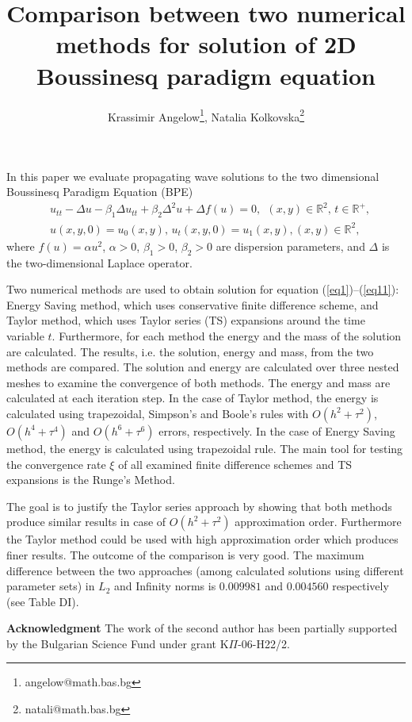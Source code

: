 \documentclass{article}
\newcommand{\RR}{\mathbb{R}}
\newcommand{\rf}[1]{(\ref{#1})}
\begin{document}
\title{Comparison between two numerical methods for solution of 2D Boussinesq paradigm equation}

\author{Krassimir Angelow\thanks{angelow@math.bas.bg}, Natalia Kolkovska\thanks{natali@math.bas.bg}}

\maketitle





In this paper we evaluate propagating wave solutions to the two dimensional Boussinesq Paradigm Equation (BPE)
\begin{align} 
&u_{tt} - \Delta u -\beta_1  \Delta u_{tt} +\beta_2 \Delta ^2 u + \Delta f(u)=0,~~     (x,y) \in \RR^2, \, t\in\RR^+, \label{eq1}
\\ &u(x,y,0)=u_0(x,y), \, u_t(x,y,0)=u_1(x,y),   (x,y) \in \RR^2,~~\label{eq11}
\end{align}
where $f(u)=\alpha u^2$,  $\alpha>0$, $\beta_1>0$, $\beta_2>0$  are dispersion parameters, and $\Delta$ is the two-dimensional Laplace operator. 

Two numerical methods are used to obtain solution for equation \rf{eq1}--\rf{eq11}: Energy Saving method, which uses conservative finite difference scheme, and Taylor method, which uses Taylor series (TS) expansions around the time variable $t$. Furthermore, for each method the energy and the mass of the solution are calculated. The results, i.e. the solution, energy and mass, from the two methods are compared.
 The solution and energy are calculated over three nested meshes to examine the convergence of both methods. The energy and mass are  calculated at each iteration step. In the case of Taylor method, the energy is calculated using trapezoidal, Simpson's and Boole's rules with $O(h^{2} + \tau^2 )$, $O(h^{4} + \tau^4 )$ and $O(h^{6} + \tau^6 )$ errors, respectively. In the case of Energy Saving method, the energy is calculated using trapezoidal rule. The main tool for testing the convergence rate $\xi$ of all examined finite difference schemes and TS expansions is the Runge's Method. 

The goal is to justify the Taylor series approach by showing that both methods produce similar results in case of $O(h^{2} + \tau^2 )$ approximation order. Furthermore the Taylor method could be used with high approximation order which produces finer results. The outcome of the comparison is very good. The maximum difference between the two approaches (among calculated solutions using different parameter sets) in $L_2$ and Infinity norms is $0.009981$ and $0.004560$ respectively (see Table DI).

{\bf{Acknowledgment}}
The work of the second author has been partially supported by
the Bulgarian Science Fund under grant K$\Pi$-06-H22/2.
\end{document}
